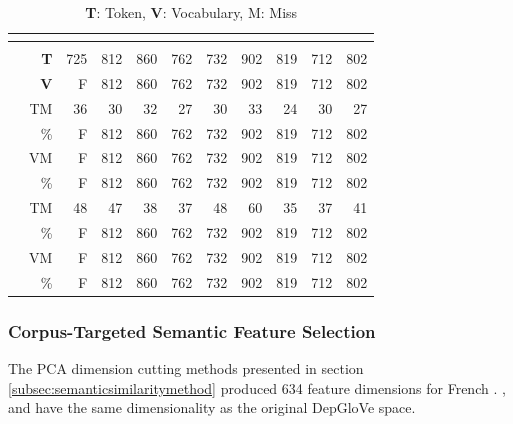 \begin{table}
    \centering
    \begin{ThreePartTable}  
    \begin{tabularx}{\textwidth}{L *{10}{R}}
     \\
    \toprule
    &  &  \\
    \toprule
     & \textbf{T} & 725 & 812 & 860 & 762 & 732 & 902 & 819 & 712 & 802 \\
    & \textbf{V} & F & 812 & 860 & 762 & 732 & 902 & 819 & 712 & 802 \\
    \midrule
     & TM & 36 & 30 & 32 & 27 & 30 & 33 & 24 & 30 & 27 \\
    & \% & F & 812 & 860 & 762 & 732 & 902 & 819 & 712 & 802 \\
    & VM & F & 812 & 860 & 762 & 732 & 902 & 819 & 712 & 802 \\
    & \% & F & 812 & 860 & 762 & 732 & 902 & 819 & 712 & 802 \\
    \midrule
     & TM & 48 & 47 & 38 & 37 & 48 & 60 & 35  & 37 & 41 \\
    & \% & F & 812 & 860 & 762 & 732 & 902 & 819 & 712 & 802 \\
    & VM & F & 812 & 860 & 762 & 732 & 902 & 819 & 712 & 802 \\
    & \% & F & 812 & 860 & 762 & 732 & 902 & 819 & 712 & 802 \\
    \bottomrule
    \end{tabularx}
    \end{ThreePartTable}
    \caption[The Little Prince Vocabulary Coverage in Semantic Spaces]{\textbf{T}: Token, \textbf{V}: Vocabulary, M: Miss\label{tab:lppcoverage}}
    \end{table}



\subsubsection{Corpus-Targeted Semantic Feature Selection}

The PCA dimension cutting methods presented in section \ref{subsec:semanticsimilaritymethod} produced 634 feature dimensions for French . ,  and  have the same dimensionality as the original DepGloVe space. 

